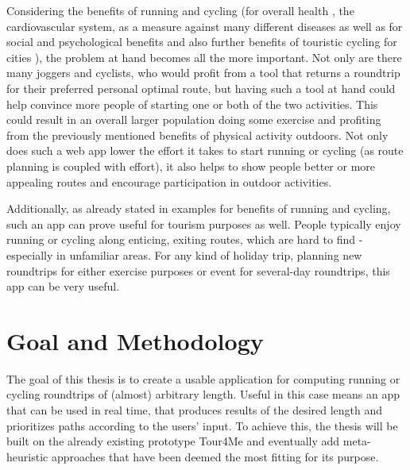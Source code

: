 Considering the benefits of running and cycling (for overall health \cite{ojaHealthBenefitsCycling2011, ruegseggerHealthBenefitsExercise2018, vinaExerciseActsDrug2012}, the cardiovascular system\cite{nystoriakCardiovascularEffectsBenefits2018}, as a measure against many different diseases\cite{ojaHealthBenefitsCycling2011} as well as for social\cite{muellerJoggingDistanceSupporting2007, obrienJoggingDistance2007, wankelPsychologicalSocialBenefits1990} and psychological benefits\cite{biddlePsychologicalBenefitsExercise1993, cekinPsychologicalBenefitsRegular2015, szaboPsychologicalBenefitsRecreational2013, wankelPsychologicalSocialBenefits1990} and also further benefits of touristic cycling for cities \cite{blondiauEconomicBenefitsIncreased2016}), the problem at hand becomes all the more important.
Not only are there many joggers and cyclists, who would profit from a tool that returns a roundtrip for their preferred personal optimal route, but having such a tool at hand could help convince more people of starting one or both of the two activities.
This could result in an overall larger population doing some exercise and profiting from the previously mentioned benefits of physical activity outdoors. 
Not only does such a web app lower the effort it takes to start running or cycling (as route planning is coupled with effort), it also helps to show people better or more appealing routes and encourage participation in outdoor activities.

Additionally, as already stated in examples for benefits of running and cycling, such an app can prove useful for tourism purposes as well. 
People typically enjoy running or cycling along enticing, exiting routes, which are hard to find - especially in unfamiliar areas.
For any kind of holiday trip, planning new roundtrips for either exercise purposes or event for several-day roundtrips, this app can be very useful.


\section{Goal and Methodology}
\label{sec:goal}


The goal of this thesis is to create a usable application for computing running or cycling roundtrips of (almost) arbitrary length. 
Useful in this case means an app that can be used in real time, that produces results of the desired length and prioritizes paths according to the users' input. 
To achieve this, the thesis will be built on the already existing prototype Tour4Me and eventually add meta-heuristic approaches that have been deemed the most fitting for its purpose. 

